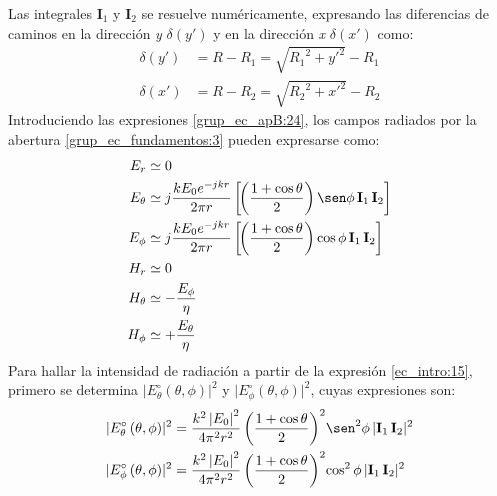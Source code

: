 Las integrales $\mathbf{I}_1$ y $\mathbf{I}_2$  se resuelve numéricamente, expresando las diferencias de caminos en la dirección \emph{y} $\delta\left(y'\right)$ y en la dirección \emph{x} $\delta\left(x'\right)$ como:
\begin{align}
\delta\left(y'\right) &= R - R_1 = \sqrt{{R_1}^2 + {y'}^2} - R_1
\label{ec_apB:141}\\
\delta\left(x'\right) &= R - R_2 = \sqrt{{R_2}^2 + {x'}^2} - R_2
\label{ec_apB:142}
\end{align}
Introduciendo las expresiones \eqref{grup_ec_apB:24}, los campos radiados por la abertura \eqref{grup_ec_fundamentos:3} pueden expresarse como:
\begin{subequations}
\label{grup_ec_apB:25}
\begin{align}
E_r &\simeq 0
\label{ec_apB:143}\\
E_{\theta} &\simeq j\dfrac{kE_0e^{-jkr}}{2\pi r}\left[\!\left(\dfrac{1 + \cos\theta}{2}\right)\sen\phi\,\mathbf{I}_1\,\mathbf{I}_2\right]
\label{ec_apB:144}\\
E_{\phi} &\simeq j\dfrac{kE_0e^{-jkr}}{2\pi r}\left[\!\left(\dfrac{1 + \cos\theta}{2}\right)\cos\phi\,\mathbf{I}_1\,\mathbf{I}_2\right]
\label{ec_apB:145}\\
H_r &\simeq 0
\label{ec_apB:146}\\
H_\theta &\simeq -\frac{E_\phi}{\eta}
\label{ec_apB:147}\\
H_\phi &\simeq +\frac{E_\theta}{\eta}
\label{ec_apB:148}
\end{align}
\end{subequations}
Para hallar la intensidad de radiación a partir de la expresión \eqref{ec_intro:15}, primero se determina $\lvert E_{\theta}^{\circ}\left(\theta,\phi\right)\rvert^2$ y $\lvert E_{\phi}^{\circ}\left(\theta,\phi\right)\vert^2$, cuyas expresiones son:
\begin{subequations}
\label{grup_ec_apB:26}
\begin{align}
\lvert E_{\theta}^{\circ}\left(\theta,\phi\right)\rvert^2 &= \frac{k^2\left|E_0\right|^2}{4\pi^2 r^2}\left(\dfrac{1 + \cos\theta}{2}\right)^2\!\sen^2\phi\,\lvert{\mathbf{I}_1}\,{\mathbf{I}_2}\rvert^2
\label{ec_apB:149}\\
\lvert E_{\phi}^{\circ}\left(\theta,\phi\right)\rvert^2 &= \frac{k^2\left|E_0\right|^2}{4\pi^2 r^2}\left(\dfrac{1 + \cos\theta}{2}\right)^2\!\cos^2\phi\,\lvert{\mathbf{I}_1}\,{\mathbf{I}_2}\rvert^2
\label{ec_apB:150}
\end{align}
\end{subequations}
